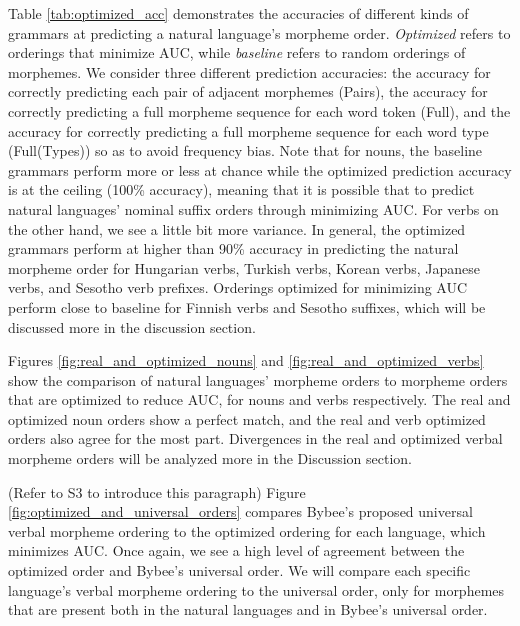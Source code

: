 \documentclass[11pt,letterpaper]{article}
\newcommand\becky[1]{{\color{blue}(#1)}}
\begin{document}
Table \ref{tab:optimized_acc} demonstrates the accuracies of different kinds of grammars at predicting a natural language's morpheme order. \textit{Optimized} refers to orderings that minimize AUC, while \textit{baseline} refers to random orderings of morphemes. We consider three different prediction accuracies: the accuracy for correctly predicting each pair of adjacent morphemes (Pairs), the accuracy for correctly predicting a full morpheme sequence for each word token (Full), and the accuracy for correctly predicting a full morpheme sequence for each word type (Full(Types)) so as to avoid frequency bias.
Note that for nouns, the baseline grammars perform more or less at chance while the optimized prediction accuracy is at the ceiling (100\% accuracy), meaning that it is possible that to predict natural languages' nominal suffix orders through minimizing AUC. 
For verbs on the other hand, we see a little bit more variance. In general, the optimized grammars perform at higher than 90\% accuracy in predicting the natural morpheme order for Hungarian verbs, Turkish verbs, Korean verbs, Japanese verbs, and Sesotho verb prefixes. Orderings optimized for minimizing AUC perform close to baseline for Finnish verbs and Sesotho suffixes, which will be discussed more in the discussion section. 

Figures \ref{fig:real_and_optimized_nouns} and \ref{fig:real_and_optimized_verbs} show the comparison of natural languages' morpheme orders to morpheme orders that are optimized to reduce AUC, for nouns and verbs respectively. The real and optimized noun orders show a perfect match, and the real and verb optimized orders also agree for the most part. Divergences in the real and optimized verbal morpheme orders will be analyzed more in the Discussion section. 

\becky{Refer to S3 to introduce this paragraph} Figure \ref{fig:optimized_and_universal_orders} compares Bybee's proposed universal verbal morpheme ordering to the optimized ordering for each language, which minimizes AUC. Once again, we see a high level of agreement between the optimized order and Bybee's universal order. We will compare each specific language's verbal morpheme ordering to the universal order, only for morphemes that are present both in the natural languages and in Bybee's universal order.
\end{document}
